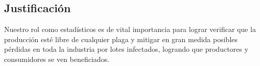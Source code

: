 

\subsection{Justificaci\'{o}n}
Nuestro rol como estad\'{i}sticos es de vital importancia para lograr verificar que la producci\'{o}n est\'{e} libre de cualquier plaga y mitigar en gran medida posibles p\'{e}rdidas en toda la industria por lotes infectados, logrando que productores y consumidores se ven beneficiados.

